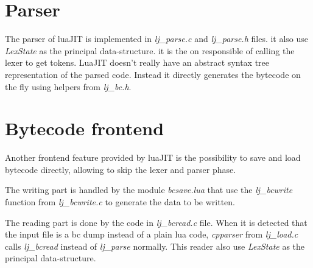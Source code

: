 \section{Parser}
\label{Sec:Parser}

The parser of luaJIT is implemented in \emph{lj\_parse.c} and \emph{lj\_parse.h}
files. it also use \emph{LexState} as the principal data-structure. it is the on
responsible of calling the lexer to get tokens. LuaJIT doesn't really have an
abstract syntax tree representation of the parsed code. Instead it directly
generates the bytecode on the fly using helpers from \emph{lj\_bc.h}.

\section{Bytecode frontend}
\label{Sec:bc-frontend}

Another frontend feature provided by luaJIT is the possibility to save and load
bytecode directly, allowing to skip the lexer and parser phase.

The writing part is handled by the module \emph{bcsave.lua} that use the
\emph{lj\_bcwrite} function from \emph{lj\_bcwrite.c} to generate the data to be written.

The reading part is done by the code in \emph{lj\_bcread.c} file. When it is
detected that the input file is a bc dump instead of a plain lua code,
\emph{cpparser} from \emph{lj\_load.c} calls \emph{lj\_bcread} instead of
\emph{lj\_parse} normally. This reader also use \emph{LexState} as the principal
data-structure.

